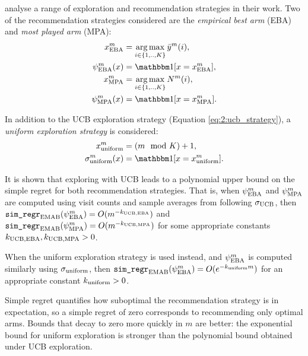    \citet{exploring_bandit} analyse a range of exploration and recommendation strategies in their work. Two of the recommendation strategies considered are the \textit{empirical best arm} (EBA) and \textit{most played arm} (MPA):
    \begin{align}
        x^m_{\eba} &= \argmax_{i\in\{1,..,K\}} \bar{y}^m(i), \label{eq:2:eba_arm} \\
        \psi^m_{\eba}(x) &= \one[x=x^m_{\eba}], \label{eq:2:eba_recommendation_strategy} \\
        x^m_{\mpa} &= \argmax_{i\in\{1,..,K\}} N^m(i), \label{eq:2:mpa_arm} \\
        \psi^m_{\mpa}(x) &= \one[x=x^m_{\mpa}]. \label{eq:2:mpa_recommendation_strategy} 
    \end{align}

    In addition to the UCB exploration strategy (Equation \ref{eq:2:ucb_strategy}), a \textit{uniform exploration strategy} is considered:
    \begin{align}
        x^m_{\uniform} &= \left(m\mod K\right)+1, \label{eq:2:uniform} \\
        \sigma^m_{\uniform}(x) &= \one[x=x^m_{\uniform}]. \label{eq:2:uniform_strategy}
    \end{align}

    It is shown that exploring with UCB leads to a polynomial upper bound on the simple regret for both recommendation strategies. That is, when $\psi^m_{{\textnormal{EBA}}}$ and $\psi^m_{{\textnormal{MPA}}}$ are computed using visit counts and sample averages from following $\sigma_{{\textnormal{UCB}}}$, then ${\textnormal{\texttt{sim\_regr}}}_{{\textnormal{EMAB}}}(\psi^m_{{\textnormal{EBA}}}) = O(m^{-k_{{\textnormal{UCB}},{\textnormal{EBA}}}})$ and ${\textnormal{\texttt{sim\_regr}}}_{{\textnormal{EMAB}}}(\psi^m_{{\textnormal{MPA}}}) = O(m^{-k_{{\textnormal{UCB}},{\textnormal{MPA}}}})$ for some appropriate constants $k_{{\textnormal{UCB}},{\textnormal{EBA}}},k_{{\textnormal{UCB}},{\textnormal{MPA}}}>0$.

    When the uniform exploration strategy is used instead, and $\psi^m_{{\textnormal{EBA}}}$ is computed similarly using $\sigma_{{\textnormal{uniform}}}$, then ${\textnormal{\texttt{sim\_regr}}}_{{\textnormal{EMAB}}}(\psi^m_{{\textnormal{EBA}}}) = O(e^{-k_{{\textnormal{uniform}}}m})$ for an appropriate constant $k_{{\textnormal{uniform}}}>0$. 
    
    Simple regret quantifies how suboptimal the recommendation strategy is in expectation, so a simple regret of zero corresponds to recommending only optimal arms. Bounds that decay to zero more quickly in $m$ are better: the exponential bound for uniform exploration is stronger than the polynomial bound obtained under UCB exploration.




